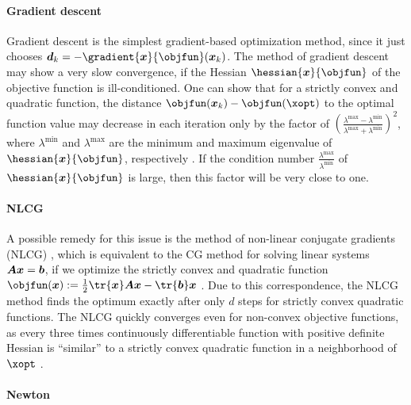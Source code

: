 \paragraph{Gradient descent}

Gradient descent
is the simplest gradient-based optimization method,
since it just chooses $\*d_k = -\gradient{\*x}{\objfun}(\*x_k)$.
The method of gradient descent may show a very slow convergence,
if the Hessian $\hessian{\*x}{\objfun}$
of the objective function is ill-conditioned.
One can show that for a strictly convex and quadratic function,
the distance $\objfun(\*x_k) - \objfun(\xopt)$
to the optimal function value may decrease in each iteration only by
the factor of
$(\frac{\lambda^{\max} - \lambda^{\min}}{\lambda^{\max} + \lambda^{\min}})^2$,
where $\lambda^{\min}$ and $\lambda^{\max}$ are the minimum and maximum
eigenvalue of $\hessian{\*x}{\objfun}$, respectively
\cite{Ulbrich12Nichtlineare}.
If the condition number $\frac{\lambda^{\max}}{\lambda^{\min}}$
of $\hessian{\*x}{\objfun}$ is large,
then this factor will be very close to one.

\paragraph{NLCG}

A possible remedy for this issue is the method of
non-linear conjugate gradients (NLCG)
,
which is equivalent to the CG method for solving \spd linear systems
${\boldsymbol{A}} {\boldsymbol{x}} = {\boldsymbol{b}}$,
if we optimize the strictly convex and quadratic function
$\objfun(\*x) := \frac{1}{2} \tr{\*x} \mat{A} \*x - \tr{\*b} \*x$
.
Due to this correspondence,
the NLCG method finds the optimum exactly after only $d$ steps
for strictly convex quadratic functions.
The NLCG quickly converges even for non-convex objective functions,
as every three times continuously differentiable function
with positive definite Hessian is ``similar'' to a
strictly convex quadratic function in a neighborhood of $\xopt$
\cite{Valentin14Hierarchische}.

\paragraph{Newton}

